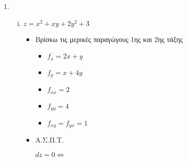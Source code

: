 


\usepackage{systeme}

\everymath{\displaystyle}




\begin{center}
\end{center}

\vspace{\baselineskip}

\begin{enumerate}
\item
\begin{enumerate}[i)]
\item $z=x^2+xy+2y^2+3$

\begin{itemize}
\item Βρίσκω τις μερικές παραγώγους 1ης και 2ης τάξης
\begin{itemize}
\item $f_x=2x+y$
\item $f_y=x+4y$
\item $f_{xx}=2$
\item $f_{yy}=4$
\item $f_{xy}=f_{yx}=1$
\end{itemize}
\item Α.Σ.Π.Τ.

$dz=0\Leftrightarrow $
\end{itemize}

\end{enumerate}
\end{enumerate}

